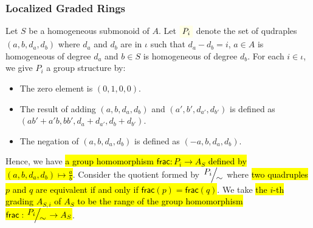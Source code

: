 \documentclass[9pt]{beamer}
\begin{document}
\begin{frame}[fragile]
  \frametitle{Localized Graded Rings}
  Let $S$ be a homogeneous submonoid of $A$. 
  Let $\mathcolorbox{yellow!10}{P_i}$ denote the set of qudraples $(a, b, d_a, d_b)$ where $d_a$ and $d_b$ are in $\iota$ such that $d_a - d_b = i$, 
$a \in A$ is homogeneous of degree $d_a$ and $b \in S$ is homogeneous of degree $d_b$.
For each $i \in \iota$, we give $P_i$ a group structure by: 
\begin{itemize}
  \item The zero element is $(0, 1, 0, 0)$.
  \item The result of adding $(a, b, d_a, d_b)$ and $(a', b', d_{a'}, d_{b'})$ is defined as
$(ab' + a'b, bb', d_a + d_{a'}, d_b + d_{b'})$.
  \item The negation of $(a, b, d_a, d_b)$ is defined as $(-a, b, d_a, d_b)$.
\end{itemize}
Hence, we have \hl{a group homomorphism $\mathsf{frac}: P_i \to A_{S}$ defined by $(a, b, d_a, d_{b}) \mapsto \frac{a}{b}$}.
Consider the quotient formed by $\quotient{P_{i}}{\sim}$ where \hl{two quadruples $p$ and $q$ are equivalent if and only if $\mathsf{frac}(p) = \mathsf{frac}(q)$}.
We take \hl{the $i$-th grading $A_{S,i}$ of $A_S$ to be the range of the group homomorphism} \hl{$\mathsf{frac} : \quotient{P_{i}}{\sim} \to A_{S}$}.

\end{frame}
\end{document}
